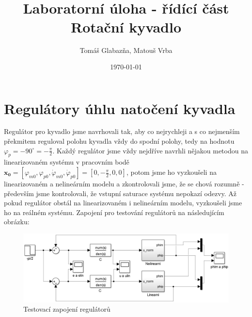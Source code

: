 \documentclass[11pt,a4paper]{article}
\title{%
  Laboratorní úloha - řídící část\\
  \large Rotační kyvadlo}
\author{Tomáš Glabazňa, Matouš Vrba}
\date{\today}
\begin{document}
\maketitle

\clearpage

\section{Regulátory úhlu natočení kyvadla}
Regulátor pro kyvadlo jsme navrhovali tak, aby co nejrychleji a s co nejmenším překmitem reguloval polohu kyvadla vždy do spodní polohy, tedy na hodnotu $\varphi_p=-90^{\circ}=-\frac{\pi}{2}$. Každý regulátor jsme vždy nejdříve navrhli nějakou metodou na linearizovaném systému v pracovním bodě $\mathbf{x_0} = \left[\varphi_{m0}, \varphi_{p0}, \dot{\varphi}_{m0}, \dot{\varphi}_{p0}\right] = \left[0, -\frac{\pi}{2}, 0, 0\right]$, potom jsme ho vyzkoušeli na linearizovaném a nelineárním modelu a zkontrolovali jsme, že se chová rozumně - především jsme kontrolovali, že vstupní saturace systému nepokazí odezvy. Až pokud regulátor obstál na linearizovaném i nelineárním modelu, vyzkoušeli jsme ho na reálném systému. Zapojení pro testování regulátorů na následujícím obrázku:
\begin{figure}[H]
	\centering
    \includegraphics[scale=0.25]{schema_rizeni_nanecisto}
    \caption{Testovací zapojení regulátorů}
\end{figure}
\end{document}
